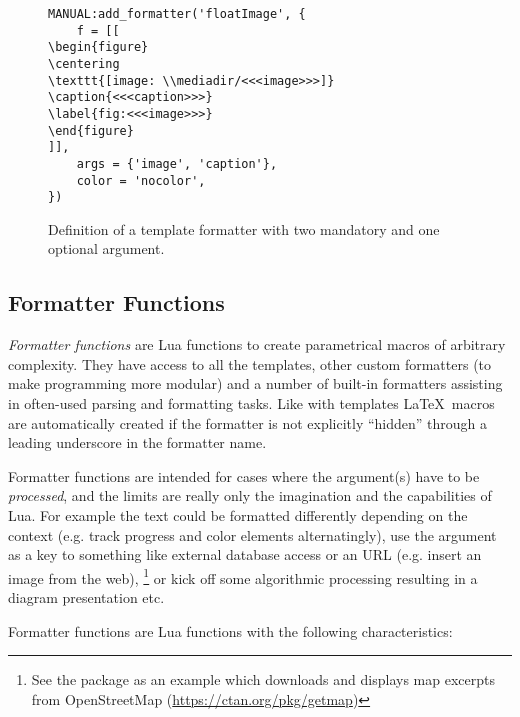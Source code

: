 \documentclass[12pt]{scrartcl}
\begin{document}
\begin{figure}
\begin{verbatim}
MANUAL:add_formatter('floatImage', {
    f = [[
\begin{figure}
\centering
\texttt{[image: \\mediadir/<<<image>>>]}
\caption{<<<caption>>>}
\label{fig:<<<image>>>}
\end{figure}
]],
    args = {'image', 'caption'},
    color = 'nocolor',
})
\end{verbatim}
\caption{Definition of a template formatter with two mandatory and one optional argument.}
\label{fig:template}
\end{figure}




\subsection{Formatter Functions}
\label{sec:formatter-functions}

\emph{Formatter functions} are Lua functions to create parametrical macros of
arbitrary complexity.  They have access to all the templates, other custom
formatters (to make programming more modular) and a number of built-in
formatters assisting in often-used parsing and formatting tasks.  Like with
templates \LaTeX\ macros are automatically created if the formatter is not
explicitly “hidden” through a leading underscore in the formatter name.

Formatter functions are intended for cases where the argument(s) have to be
\emph{processed}, and the limits are really only the imagination and the
capabilities of Lua.  For example the text could be formatted differently
depending on the context (e.g. track progress and color elements alternatingly),
use the argument as a key to something like external database access or an
URL (e.g. insert an image from the web),%
\footnote{See the  package as an example which downloads and
displays map excerpts from OpenStreetMap (\url{https://ctan.org/pkg/getmap})} %
or kick off some algorithmic processing resulting in a diagram presentation etc.

\medskip

Formatter functions are Lua functions with the following characteristics:
\end{document}
